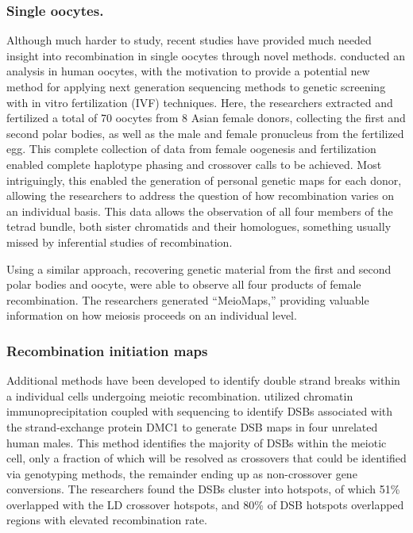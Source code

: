 \subsubsection{Single oocytes.}
Although much harder to study, recent studies have provided much needed insight into recombination in single oocytes through novel methods.
\citet{Hou2013} conducted an analysis in human oocytes, with the motivation to provide a potential new method for applying next generation sequencing methods to genetic screening with in vitro fertilization (IVF) techniques.
Here, the researchers extracted and fertilized a total of 70 oocytes from 8 Asian female donors, collecting the first and second polar bodies, as well as the male and female pronucleus from the fertilized egg.
This complete collection of data from female oogenesis and fertilization enabled complete haplotype phasing and crossover calls to be achieved.
Most intriguingly, this enabled the generation of personal genetic maps for each donor, allowing the researchers to address the question of how recombination varies on an individual basis.
This data allows the observation of all four members of the tetrad bundle, both sister chromatids and their homologues, something usually missed by inferential studies of recombination.


Using a similar approach, recovering genetic material from the first and second polar bodies and oocyte, \citet{Ottolini2015} were able to observe all four products of female recombination.
The researchers generated ``MeioMaps,'' providing valuable information on how meiosis proceeds on an individual level.



\subsubsection{Recombination initiation maps}
Additional methods have been developed to identify double strand breaks within a individual cells undergoing meiotic recombination.
\citet{Pratto2014} utilized chromatin immunoprecipitation coupled with sequencing to identify DSBs associated with the strand-exchange protein DMC1 to generate DSB maps in four unrelated human males.
This method identifies the majority of DSBs within the meiotic cell, only a fraction of which will be resolved as crossovers that could be identified via genotyping methods, the remainder ending up as non-crossover gene conversions.
The researchers found the DSBs cluster into hotspots, of which 51\% overlapped with the LD crossover hotspots\cite{hapmap2007}, and 80\% of DSB hotspots overlapped regions with elevated recombination rate.


